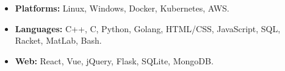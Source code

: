 \begin{itemize}
    \item 
    \textbf{Platforms:} Linux, Windows, Docker, Kubernetes, AWS.
    \item 
    \textbf{Languages:} C++, C, Python, Golang, HTML/CSS, JavaScript, SQL, Racket, MatLab, Bash.
    \item 
    \textbf{Web:} React, Vue, jQuery, Flask, SQLite, MongoDB.
\end{itemize}
